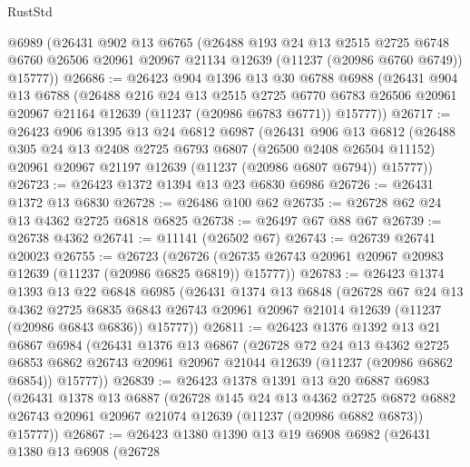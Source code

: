 \begin{lexlean}{RustStd}
\begin{coremodule}
    @6989
    (@26431
      @902
      @13
      @6765
      (@26488
        @193
        @24
        @13
        @2515
        @2725
        @6748
        @6760
        @26506
        @20961
        @20967
        @21134
        @12639
        (@11237 (@20986 @6760 @6749))
        @15777))
@26686 := @26423
    @904
    @1396
    @13
    @30
    @6788
    @6988
    (@26431
      @904
      @13
      @6788
      (@26488
        @216
        @24
        @13
        @2515
        @2725
        @6770
        @6783
        @26506
        @20961
        @20967
        @21164
        @12639
        (@11237 (@20986 @6783 @6771))
        @15777))
@26717 := @26423
    @906
    @1395
    @13
    @24
    @6812
    @6987
    (@26431
      @906
      @13
      @6812
      (@26488
        @305
        @24
        @13
        @2408
        @2725
        @6793
        @6807
        (@26500 @2408 @26504 @11152)
        @20961
        @20967
        @21197
        @12639
        (@11237 (@20986 @6807 @6794))
        @15777))
@26723 := @26423 @1372 @1394 @13 @23 @6830 @6986
@26726 := @26431 @1372 @13 @6830
@26728 := @26486 @100 @62
@26735 := @26728 @62 @24 @13 @4362 @2725 @6818 @6825
@26738 := @26497 @67 @88 @67
@26739 := @26738 @4362
@26741 := @11141 (@26502 @67)
@26743 := @26739 @26741 @20023
@26755 := @26723
    (@26726 (@26735 @26743 @20961 @20967 @20983 @12639 (@11237 (@20986 @6825 @6819)) @15777))
@26783 := @26423
    @1374
    @1393
    @13
    @22
    @6848
    @6985
    (@26431
      @1374
      @13
      @6848
      (@26728
        @67
        @24
        @13
        @4362
        @2725
        @6835
        @6843
        @26743
        @20961
        @20967
        @21014
        @12639
        (@11237 (@20986 @6843 @6836))
        @15777))
@26811 := @26423
    @1376
    @1392
    @13
    @21
    @6867
    @6984
    (@26431
      @1376
      @13
      @6867
      (@26728
        @72
        @24
        @13
        @4362
        @2725
        @6853
        @6862
        @26743
        @20961
        @20967
        @21044
        @12639
        (@11237 (@20986 @6862 @6854))
        @15777))
@26839 := @26423
    @1378
    @1391
    @13
    @20
    @6887
    @6983
    (@26431
      @1378
      @13
      @6887
      (@26728
        @145
        @24
        @13
        @4362
        @2725
        @6872
        @6882
        @26743
        @20961
        @20967
        @21074
        @12639
        (@11237 (@20986 @6882 @6873))
        @15777))
@26867 := @26423
    @1380
    @1390
    @13
    @19
    @6908
    @6982
    (@26431
      @1380
      @13
      @6908
      (@26728

\end{coremodule}
\end{lexlean}
